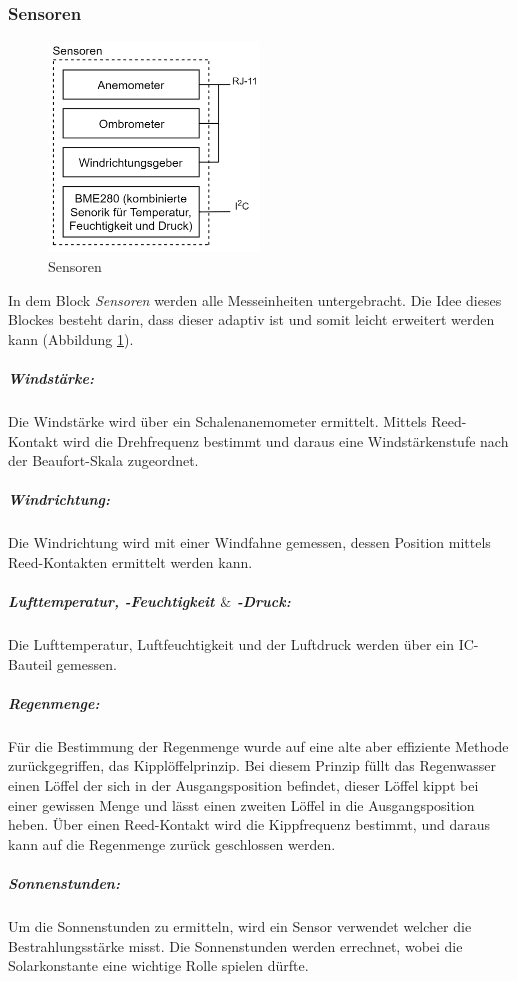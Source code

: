 \subsubsection{Sensoren}
\begin{figure}[h]
\centering
\includegraphics[width=0.5\textwidth]{graphics/Konzeptdiagramme/Sensoren.PNG} 
\caption{Sensoren}
\label{fig:sensoren}
\end{figure}
In dem Block \textit{Sensoren} werden alle Messeinheiten untergebracht. Die Idee dieses Blockes besteht darin, dass dieser adaptiv ist und somit leicht erweitert werden kann (Abbildung \ref{fig:sensoren}).\\

\subparagraph{Windstärke:}
Die Windstärke wird über ein Schalenanemometer ermittelt. Mittels Reed-Kontakt wird die Drehfrequenz bestimmt und daraus eine Windstärkenstufe nach der Beaufort-Skala zugeordnet.\\
\subparagraph{Windrichtung:}
Die Windrichtung wird mit einer Windfahne gemessen, dessen Position mittels Reed-Kontakten ermittelt werden kann.\\
\subparagraph{Lufttemperatur, -Feuchtigkeit $\&$ -Druck:}
Die Lufttemperatur, Luftfeuchtigkeit und der Luftdruck werden über ein IC-Bauteil gemessen.\\
\subparagraph{Regenmenge:}
Für die Bestimmung der Regenmenge wurde auf eine alte aber effiziente Methode zurückgegriffen, das Kipplöffelprinzip. Bei diesem Prinzip füllt das Regenwasser einen Löffel der sich in der Ausgangsposition befindet, dieser Löffel kippt bei einer gewissen Menge und lässt einen zweiten Löffel in die Ausgangsposition heben. Über einen Reed-Kontakt wird die Kippfrequenz bestimmt, und daraus kann auf die Regenmenge zurück geschlossen werden.\\
\subparagraph{Sonnenstunden:}
Um die Sonnenstunden zu ermitteln, wird ein Sensor verwendet welcher die Bestrahlungsstärke misst. Die Sonnenstunden werden errechnet, wobei die Solarkonstante eine wichtige Rolle spielen dürfte.\\
\newpage